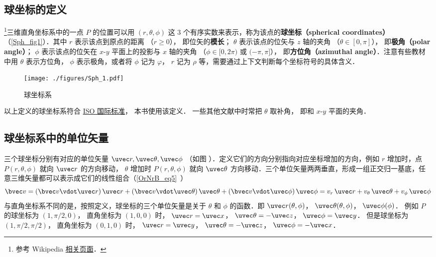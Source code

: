 

\subsection{球坐标的定义}

\footnote{参考 Wikipedia \href{https://en.wikipedia.org/wiki/Spherical_coordinate_system}{相关页面}．}三维直角坐标系中的一点 $P$ 的位置可以用 $(r,\theta ,\phi )$ 这 3 个有序实数来表示，称为该点的\textbf{球坐标（spherical coordinates）}（\autoref{Sph_fig1}）．其中 $r$ 表示该点到原点的距离 （$r \geqslant 0$）， 即位矢的\textbf{模长}； $\theta$ 表示该点的位矢与 $z$ 轴的夹角 （$\theta  \in [0,\pi]$）， 即\textbf{极角（polar angle）}； $\phi$ 表示该点的位矢在 $x$-$y$ 平面上的投影与 $x$ 轴的夹角 （$\phi  \in [0,2\pi)$ 或 $(- \pi,\pi]$）， 即\textbf{方位角（azimuthal angle）}．注意有些教材中用 $\theta $ 表示方位角， $\phi $ 表示极角，或者将 $\phi $ 记为 $\varphi $，  $r$ 记为 $\rho $ 等，需要通过上下文判断每个坐标符号的具体含义．

\begin{figure}[ht]
\centering
\texttt{[image: ./figures/Sph\_1.pdf]}
\caption{球坐标系}\label{Sph_fig1}
\end{figure}

以上定义的球坐标系符合 \href{https://www.iso.org/standard/64973.html}{ISO 国际标准}， 本书使用该定义． 一些其他文献中时常把 $\theta$ 取补角， 即和 $x$-$y$ 平面的夹角．

\subsection{球坐标系中的单位矢量}
三个球坐标分别有对应的单位矢量 $\uvec r, \uvec\theta, \uvec\phi$ （如图%
）．定义它们的方向分别指向对应坐标增加的方向，例如 $r$ 增加时，点 $P(r,\theta ,\phi )$ 就向 $\uvec r$ 的方向移动， $\theta$ 增加时 $P(r,\theta ,\phi )$ 就向 $\uvec \theta$ 方向移动．三个单位矢量两两垂直，形成一组正交归一基底，任意三维矢量都可以表示成它们的线性组合（\autoref{OrNrB_eq5}~）
\begin{equation}
\bvec v = (\bvec v \vdot \uvec r)\,\uvec r + (\bvec v \vdot \uvec \theta)\,\uvec \theta  + (\bvec v \vdot \uvec \phi)\,\uvec \phi  = v_r \,\uvec r + v_\theta \,\uvec \theta  + v_\phi \,\uvec \phi 
\end{equation}
与直角坐标系不同的是，按照定义，球坐标的三个单位矢量是关于 $\theta$ 和 $\phi$ 的函数．即
$\uvec r(\theta ,\phi )$，  $\uvec \theta (\theta ,\phi )$，  $\uvec \phi (\phi )$． 
例如 $P$ 的球坐标为 $(1, \pi/2, 0)$， 直角坐标为 $(1, 0, 0)$ 时，
$\uvec r = \uvec x$， $\uvec \theta  =  - \uvec z$， $\uvec \phi  = \uvec y$． 
但是球坐标为 $(1, \pi/2, \pi/2)$， 直角坐标为 $(0, 1, 0)$ 时， $\uvec r = \uvec y$， $\uvec \theta  =  - \uvec z$， $\uvec \phi  =  - \uvec x$． 

